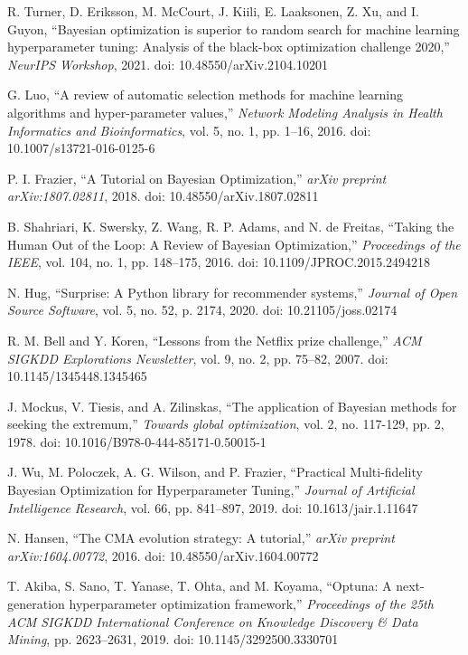 \documentclass[conference]{IEEEtran}
\begin{document}
\begin{thebibliography}{00}
R. Turner, D. Eriksson, M. McCourt, J. Kiili, E. Laaksonen, Z. Xu, and I. Guyon, ``Bayesian optimization is superior to random search for machine learning hyperparameter tuning: Analysis of the black-box optimization challenge 2020,'' \textit{NeurIPS Workshop}, 2021. doi: 10.48550/arXiv.2104.10201

G. Luo, ``A review of automatic selection methods for machine learning algorithms and hyper-parameter values,'' \textit{Network Modeling Analysis in Health Informatics and Bioinformatics}, vol. 5, no. 1, pp. 1--16, 2016. doi: 10.1007/s13721-016-0125-6

P. I. Frazier, ``A Tutorial on Bayesian Optimization,'' \textit{arXiv preprint arXiv:1807.02811}, 2018. doi: 10.48550/arXiv.1807.02811

B. Shahriari, K. Swersky, Z. Wang, R. P. Adams, and N. de Freitas, ``Taking the Human Out of the Loop: A Review of Bayesian Optimization,'' \textit{Proceedings of the IEEE}, vol. 104, no. 1, pp. 148--175, 2016. doi: 10.1109/JPROC.2015.2494218

N. Hug, ``Surprise: A Python library for recommender systems,'' \textit{Journal of Open Source Software}, vol. 5, no. 52, p. 2174, 2020. doi: 10.21105/joss.02174

R. M. Bell and Y. Koren, ``Lessons from the Netflix prize challenge,'' \textit{ACM SIGKDD Explorations Newsletter}, vol. 9, no. 2, pp. 75--82, 2007. doi: 10.1145/1345448.1345465

J. Mockus, V. Tiesis, and A. Zilinskas, ``The application of Bayesian methods for seeking the extremum,'' \textit{Towards global optimization}, vol. 2, no. 117-129, pp. 2, 1978. doi: 10.1016/B978-0-444-85171-0.50015-1

J. Wu, M. Poloczek, A. G. Wilson, and P. Frazier, ``Practical Multi-fidelity Bayesian Optimization for Hyperparameter Tuning,'' \textit{Journal of Artificial Intelligence Research}, vol. 66, pp. 841--897, 2019. doi: 10.1613/jair.1.11647

N. Hansen, ``The CMA evolution strategy: A tutorial,'' \textit{arXiv preprint arXiv:1604.00772}, 2016. doi: 10.48550/arXiv.1604.00772

T. Akiba, S. Sano, T. Yanase, T. Ohta, and M. Koyama, ``Optuna: A next-generation hyperparameter optimization framework,'' \textit{Proceedings of the 25th ACM SIGKDD International Conference on Knowledge Discovery \& Data Mining}, pp. 2623--2631, 2019. doi: 10.1145/3292500.3330701


\end{thebibliography}
\end{document}
